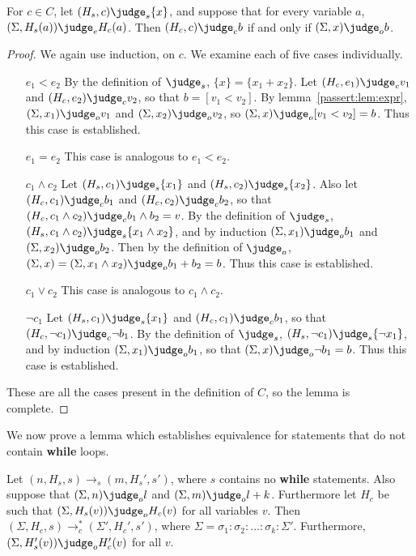 \begin{lemma} \label{passert:lem:cond}
  For $c \in C$, let $(H_s, c) \judge_s \{ x \}$, and suppose that for
  every variable $a$, $(\Sigma, H_s(a)) \judge_e H_c(a)$.  Then $(H_c,
  c) \judge_c b$ if and only if $(\Sigma, x) \judge_o b$.
\end{lemma}

\begin{proof}
We again use induction, on $c$.  We examine each of five cases
individually.

\begin{itemize}
\item[$e_1 < e_2$] By the definition of $\judge_s$, $\{ x \} = \{ x_1
  + x_2 \}$.  Let $(H_c, e_1) \judge_c v_1$ and $(H_c, e_2) \judge_c
  v_2$, so that $b = [v_1 < v_2]$.  By lemma~\ref{passert:lem:expr}, $(\Sigma,
  x_1) \judge_o v_1$ and $(\Sigma, x_2) \judge_o v_2$, so $(\Sigma, x)
  \judge_o [v_1 < v_2] = b$.  Thus this case is established.
\item[$e_1 = e_2$] This case is analogous to $e_1 < e_2$.
\item[$c_1 \wedge c_2$] Let $(H_s, c_1) \judge_s \{ x_1 \}$ and $(H_s,
  c_2) \judge_s \{ x_2 \}$. Also let $(H_c, c_1) \judge_c b_1$ and
  $(H_c, c_2) \judge_c b_2$, so that $(H_c, c_1 \wedge c_2) \judge_c
  b_1 \wedge b_2 = v$.  By the definition of $\judge_s$, $(H_s, c_1
  \wedge c_2) \judge_s \{ x_1 \wedge x_2 \}$, and by induction
  $(\Sigma, x_1) \judge_o b_1$ and $(\Sigma, x_2) \judge_o b_2$.  Then
  by the definition of $\judge_o$, $(\Sigma, x) = (\Sigma, x_1 \wedge
  x_2) \judge_o b_1 + b_2 = b$.  Thus this case is established.
\item[$c_1 \vee c_2$] This case is analogous to $c_1 \wedge c_2$.
\item[$\neg c_1$] Let $(H_s, c_1) \judge_s \{ x_1 \}$ and $(H_c, c_1)
  \judge_c b_1$, so that $(H_c, \neg c_1) \judge_c \neg b_1$.  By the
  definition of $\judge_s$, $(H_s, \neg c_1) \judge_s \{ \neg x_1 \}$,
  and by induction $(\Sigma, x_1) \judge_o b_1$, so that $(\Sigma, x)
  \judge_o \neg b_1 = b$.  Thus this case is established.
\end{itemize}

These are all the cases present in the definition of $C$, so the lemma
is complete.
\end{proof}

We now prove a lemma which establishes equivalence for statements that
do not contain \textbf{while} loops.

\begin{lemma}
  \label{passert:lem:stmt}
  Let
  $(n, H_s, s) \to_s (m, H_s', s')$,
  where $s$ contains no \textbf{while} statements.
  Also suppose that $(\Sigma, n) \judge_o l$
  and $(\Sigma, m) \judge_o l + k$.
  Furthermore let $H_c$ be such that
  $(\Sigma, H_s(v)) \judge_o H_c(v)$
  for all variables $v$. Then
  $(\Sigma, H_c, s) \to_c^{*} (\Sigma', H_c', s')$,
  where
  $\Sigma = \sigma_1:\sigma_2:\dots:\sigma_k:\Sigma'$.
  Furthermore,
  $(\Sigma, H_s'(v)) \judge_o H_c'(v)$
  for all $v$.
\end{lemma}


